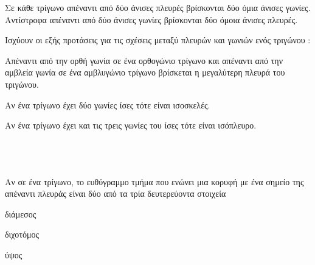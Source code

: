 \documentclass[twoside,nofonts,ektypwsh,shmeiwseis]{thewria}
\begin{document}
Σε κάθε τρίγωνο απέναντι από δύο άνισες πλευρές βρίσκονται δύο όμια άνισες γωνίες. Αντίστροφα απέναντι από δύο άνισες γωνίες βρίσκονται δύο όμοια άνισες πλευρές.
\begin{center}
\end{center}
Ισχύουν οι εξής προτάσεις για τις σχέσεις μεταξύ πλευρών και γωνιών ενός τριγώνου :
\begin{rlist}
\item Απέναντι από την ορθή γωνία σε ένα ορθογώνιο τρίγωνο και απέναντι από την αμβλεία γωνία σε ένα αμβλυγώνιο τρίγωνο βρίσκεται η μεγαλύτερη πλευρά του τριγώνου.
\item Αν ένα τρίγωνο έχει δύο γωνίες ίσες τότε είναι ισοσκελές.
\item Αν ένα τρίγωνο έχει και τις τρεις γωνίες του ίσες τότε είναι ισόπλευρο.
\end{rlist}
\mbox{}\\\\\\
Αν σε ένα τρίγωνο, το ευθύγραμμο τμήμα που ενώνει μια κορυφή με ένα σημείο της απέναντι πλευράς είναι δύο από τα τρία δευτερεύοντα στοιχεία
\begin{multicols}{3}
\begin{rlist}
\item διάμεσος
\item διχοτόμος
\item ύψος
\end{rlist}
\end{multicols}
\end{document}
